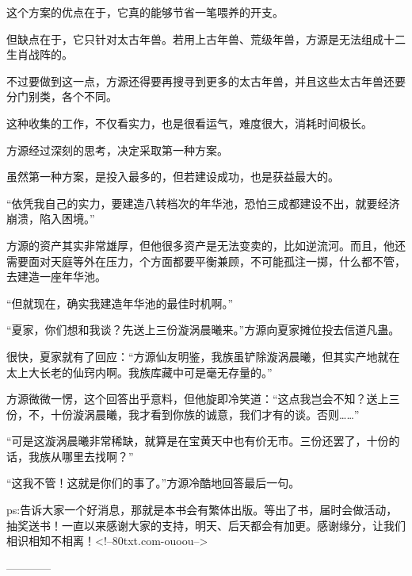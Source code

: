 \begin{this_body}
这个方案的优点在于，它真的能够节省一笔喂养的开支。

但缺点在于，它只针对太古年兽。若用上古年兽、荒级年兽，方源是无法组成十二生肖战阵的。

不过要做到这一点，方源还得要再搜寻到更多的太古年兽，并且这些太古年兽还要分门别类，各个不同。

这种收集的工作，不仅看实力，也是很看运气，难度很大，消耗时间极长。

方源经过深刻的思考，决定采取第一种方案。

虽然第一种方案，是投入最多的，但若建设成功，也是获益最大的。

“依凭我自己的实力，要建造八转档次的年华池，恐怕三成都建设不出，就要经济崩溃，陷入困境。”

方源的资产其实非常雄厚，但他很多资产是无法变卖的，比如逆流河。而且，他还需要面对天庭等外在压力，个方面都要平衡兼顾，不可能孤注一掷，什么都不管，去建造一座年华池。

“但就现在，确实我建造年华池的最佳时机啊。”

“夏家，你们想和我谈？先送上三份漩涡晨曦来。”方源向夏家摊位投去信道凡蛊。

很快，夏家就有了回应：“方源仙友明鉴，我族虽铲除漩涡晨曦，但其实产地就在太上大长老的仙窍内啊。我族库藏中可是毫无存量的。”

方源微微一愣，这个回答出乎意料，但他旋即冷笑道：“这点我岂会不知？送上三份，不，十份漩涡晨曦，我才看到你族的诚意，我们才有的谈。否则……”

“可是这漩涡晨曦非常稀缺，就算是在宝黄天中也有价无市。三份还罢了，十份的话，我族从哪里去找啊？”

“这我不管！这就是你们的事了。”方源冷酷地回答最后一句。

ps:告诉大家一个好消息，那就是本书会有繁体出版。等出了书，届时会做活动，抽奖送书！一直以来感谢大家的支持，明天、后天都会有加更。感谢缘分，让我们相识相知不相离！<!--80txt.com-ouoou-->

------------

\end{this_body}

